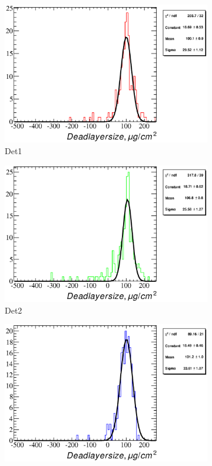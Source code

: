 \documentclass[a4paper,12pt]{article}
\begin{document}
\begin{figure}
\begin{subfigure}[b]{0.325\textwidth}
\includegraphics[width=\textwidth]{gfx/run13_alpha_study/B2D/c_hDeadLayerSize_by_run_distribution1_B2D.eps}
\caption{Det1}
\end{subfigure}
\hfill
\begin{subfigure}[b]{0.325\textwidth}
\includegraphics[width=\textwidth]{gfx/run13_alpha_study/B2D/c_hDeadLayerSize_by_run_distribution2_B2D.eps}
\caption{Det2}
\end{subfigure}
\hfill
\begin{subfigure}[b]{0.325\textwidth}
\includegraphics[width=\textwidth]{gfx/run13_alpha_study/B2D/c_hDeadLayerSize_by_run_distribution3_B2D.eps}

\end{subfigure}
\end{figure}
\end{document}
